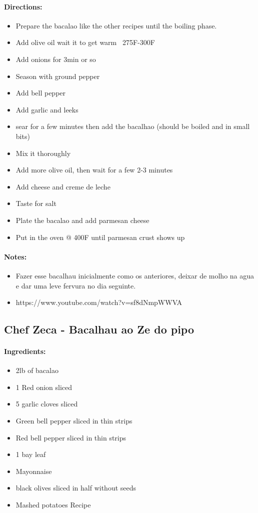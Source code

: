 \documentclass{article}
\begin{document}
\paragraph{Directions:}
\begin{itemize}
    \item Prepare the bacalao like the other recipes until the boiling phase.
    \item Add olive oil wait it to get warm ~275F-300F
    \item Add onions for 3min or so
    \item Season with ground pepper
    \item Add bell pepper
    \item Add garlic and leeks
    \item sear for a few minutes then add the bacalhao (should be boiled and in small bits)
    \item Mix it thoroughly
    \item Add more olive oil, then wait for a few 2-3 minutes
    \item Add cheese and creme de leche
    \item Taste for salt
    \item Plate the bacalao and add parmesan cheese
    \item Put in the oven @ 400F until parmesan crust shows up
\end{itemize}

\paragraph{Notes:}
\begin{itemize}
    \item Fazer esse bacalhau inicialmente como os anteriores, deixar de molho na agua e dar uma leve fervura no dia seguinte.
    \item https://www.youtube.com/watch?v=sf8dNmpWWVA
\end{itemize}

\subsection{Chef Zeca - Bacalhau ao Ze do pipo}

\paragraph{Ingredients:}
\begin{itemize}
    \item 2lb of bacalao
    \item 1 Red onion sliced
    \item 5 garlic cloves sliced
    \item Green bell pepper sliced in thin strips
    \item Red bell pepper sliced in thin strips
    \item 1 bay leaf
    \item Mayonnaise
    \item black olives sliced in half without seeds
    \item Mashed potatoes Recipe
\end{itemize}
\end{document}
